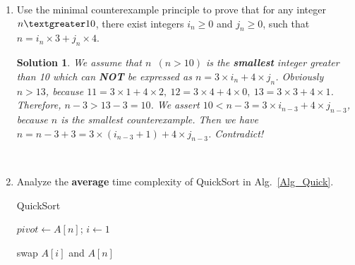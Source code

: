 \documentclass{article}
\newtheorem*{solution}{Solution}
\begin{document}
\begin{enumerate}
\item Use the minimal counterexample principle to prove that for any integer $n \textgreater 10$, there exist integers $i_n\geq0$ and $j_n\geq 0$, such that $n = i_n \times 3 + j_n \times 4$.
~\\
\begin{solution}
  We assume that $n$\ $(n>10)$ is the \textbf{smallest} integer greater than 10 which can \textbf{NOT} be expressed as $n=3\times i_n+4\times j_n$. Obviously $n > 13$, because $11=3\times1+4\times2,\ 12=3\times4+4\times0,\ 13=3\times3+4\times1$.
  Therefore, $n-3>13-3=10$. We assert $10 < n-3 = 3\times i_{n-3}+4\times j_{n-3}$, because $n$ is the smallest counterexample. Then we have $n=n-3+3=3\times (i_{n-3}+1)+4\times j_{n-3}$. Contradict!
\end{solution}
~\\

\item  Analyze the \textbf{average} time complexity of QuickSort in Alg.~\ref{Alg_Quick}.

    \begin{minipage}[t]{0.8\textwidth}
    \begin{algorithm}[H]

      \BlankLine
      \caption{QuickSort}\label{Alg_Quick}


      $pivot \leftarrow A[n]$; $i \leftarrow 1$\;

      swap $A[i]$ and $A[n]$\;
    \end{algorithm}
    \end{minipage}
    

\end{enumerate}
\end{document}
